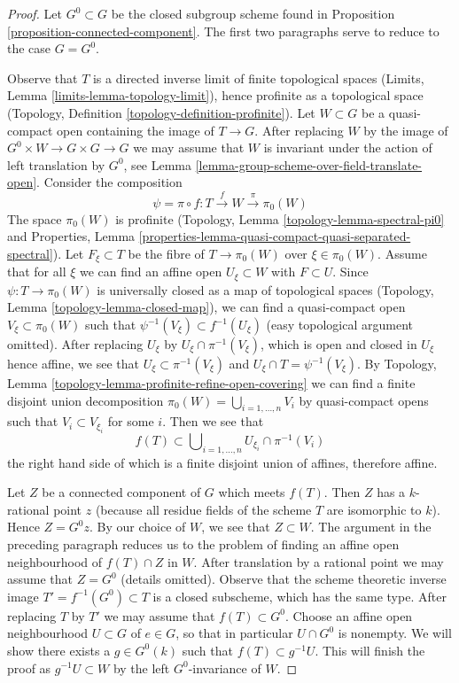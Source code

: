 \begin{proof}
Let $G^0 \subset G$ be the closed subgroup scheme found in
Proposition \ref{proposition-connected-component}. The first two paragraphs
serve to reduce to the case $G = G^0$.

\medskip\noindent
Observe that $T$ is a directed inverse limit of finite topological spaces
(Limits, Lemma \ref{limits-lemma-topology-limit}), hence profinite as a
topological space (Topology, Definition \ref{topology-definition-profinite}).
Let $W \subset G$ be a quasi-compact open containing the image of $T \to G$.
After replacing $W$ by the image of $G^0 \times W \to G \times G \to G$ we may
assume that $W$ is invariant under the action of left translation by $G^0$, see
Lemma \ref{lemma-group-scheme-over-field-translate-open}.
Consider the composition
$$
\psi = \pi \circ f : T \xrightarrow{f} W \xrightarrow{\pi} \pi_0(W)
$$
The space $\pi_0(W)$ is profinite
(Topology, Lemma \ref{topology-lemma-spectral-pi0} and
Properties, Lemma
\ref{properties-lemma-quasi-compact-quasi-separated-spectral}).
Let $F_\xi \subset T$ be the fibre of $T \to \pi_0(W)$ over $\xi \in \pi_0(W)$.
Assume that for all $\xi$ we can find an affine open $U_\xi \subset W$ with
$F \subset U$. Since $\psi : T \to \pi_0(W)$ is universally closed as a map of
topological spaces (Topology, Lemma \ref{topology-lemma-closed-map}),
we can find a quasi-compact open $V_\xi \subset \pi_0(W)$ such that
$\psi^{-1}(V_\xi) \subset f^{-1}(U_\xi)$ (easy topological argument omitted).
After replacing $U_\xi$ by $U_\xi \cap \pi^{-1}(V_\xi)$, which is open and
closed in $U_\xi$ hence affine, we see that $U_\xi \subset \pi^{-1}(V_\xi)$
and $U_\xi \cap T = \psi^{-1}(V_\xi)$.
By Topology, Lemma \ref{topology-lemma-profinite-refine-open-covering}
we can find a finite disjoint union decomposition
$\pi_0(W) = \bigcup_{i = 1, \ldots, n} V_i$ by quasi-compact opens such that
$V_i \subset V_{\xi_i}$ for some $i$. Then we see that
$$
f(T) \subset \bigcup\nolimits_{i = 1, \ldots, n} U_{\xi_i} \cap \pi^{-1}(V_i)
$$
the right hand side of which is a finite disjoint union of affines, therefore
affine.

\medskip\noindent
Let $Z$ be a connected component of $G$ which meets $f(T)$. Then $Z$
has a $k$-rational point $z$ (because all residue fields of the scheme $T$
are isomorphic to $k$). Hence $Z = G^0 z$. By our choice of $W$, we see
that $Z \subset W$. The argument in the preceding paragraph reduces us to
the problem of finding an affine open neighbourhood of $f(T) \cap Z$ in $W$.
After translation by a rational point we may assume that $Z = G^0$
(details omitted). Observe that the scheme theoretic inverse image
$T' = f^{-1}(G^0) \subset T$ is a closed subscheme, which has the same type.
After replacing $T$ by $T'$ we may assume that $f(T) \subset G^0$.
Choose an affine open neighbourhood $U \subset G$
of $e \in G$, so that in particular $U \cap G^0$ is nonempty. We will show
there exists a $g \in G^0(k)$ such that $f(T) \subset g^{-1}U$.
This will finish the proof as $g^{-1}U \subset W$ by the left
$G^0$-invariance of $W$.


\end{proof}
